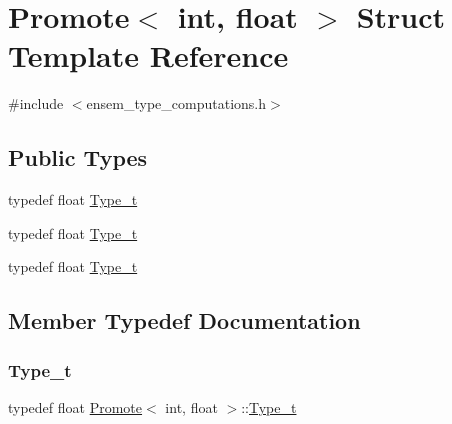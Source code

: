 \hypertarget{structPromote_3_01int_00_01float_01_4}{}\section{Promote$<$ int, float $>$ Struct Template Reference}
\label{structPromote_3_01int_00_01float_01_4}


{\ttfamily \#include $<$ensem\+\_\+type\+\_\+computations.\+h$>$}

\subsection*{Public Types}
\begin{DoxyCompactItemize}
\item 
typedef float \mbox{\hyperlink{structPromote_3_01int_00_01float_01_4_a368c812e2854d25d70464511b524bd9e}{Type\+\_\+t}}
\item 
typedef float \mbox{\hyperlink{structPromote_3_01int_00_01float_01_4_a368c812e2854d25d70464511b524bd9e}{Type\+\_\+t}}
\item 
typedef float \mbox{\hyperlink{structPromote_3_01int_00_01float_01_4_a368c812e2854d25d70464511b524bd9e}{Type\+\_\+t}}
\end{DoxyCompactItemize}


\subsection{Member Typedef Documentation}
\mbox{\label{structPromote_3_01int_00_01float_01_4_a368c812e2854d25d70464511b524bd9e}} 
\subsubsection{\texorpdfstring{Type\_t}{Type\_t}\hspace{0.1cm}{\footnotesize\ttfamily [1/3]}}
{\footnotesize\ttfamily typedef float \mbox{\hyperlink{structPromote}{Promote}}$<$ int, float $>$\+::\mbox{\hyperlink{structPromote_3_01int_00_01float_01_4_a368c812e2854d25d70464511b524bd9e}{Type\+\_\+t}}}

\mbox{\label{structPromote_3_01int_00_01float_01_4_a368c812e2854d25d70464511b524bd9e}} 

